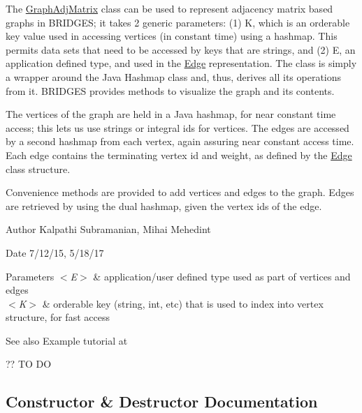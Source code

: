 The \hyperlink{classbridges_1_1base_1_1_graph_adj_matrix}{Graph\+Adj\+Matrix} class can be used to represent adjacency matrix based graphs in B\+R\+I\+D\+G\+ES; it takes 2 generic parameters\+: (1) K, which is an orderable key value used in accessing vertices (in constant time) using a hashmap. This permits data sets that need to be accessed by keys that are strings, and (2) E, an application defined type, and used in the \hyperlink{classbridges_1_1base_1_1_edge}{Edge} representation. The class is simply a wrapper around the Java Hashmap class and, thus, derives all its operations from it. B\+R\+I\+D\+G\+ES provides methods to visualize the graph and its contents.

The vertices of the graph are held in a Java hashmap, for near constant time access; this lets us use strings or integral ids for vertices. The edges are accessed by a second hashmap from each vertex, again assuring near constant access time. Each edge contains the terminating vertex id and weight, as defined by the \hyperlink{classbridges_1_1base_1_1_edge}{Edge} class structure.

Convenience methods are provided to add vertices and edges to the graph. Edges are retrieved by using the dual hashmap, given the vertex ids of the edge.

\begin{DoxyAuthor}{Author}
Kalpathi Subramanian, Mihai Mehedint
\end{DoxyAuthor}
\begin{DoxyDate}{Date}
7/12/15, 5/18/17
\end{DoxyDate}

\begin{DoxyParams}{Parameters}
{\em $<$\+E$>$} & application/user defined type used as part of vertices and edges \\
\hline
{\em $<$\+K$>$} & orderable key (string, int, etc) that is used to index into vertex structure, for fast access\\
\hline
\end{DoxyParams}
\begin{DoxySeeAlso}{See also}
Example tutorial at 
\end{DoxySeeAlso}
?? TO DO 

\subsection{Constructor \& Destructor Documentation}
\hypertarget{classbridges_1_1base_1_1_graph_adj_matrix_aaf71e89e2239d42f3ef37570665fb49d}{}\label{classbridges_1_1base_1_1_graph_adj_matrix_aaf71e89e2239d42f3ef37570665fb49d} 
